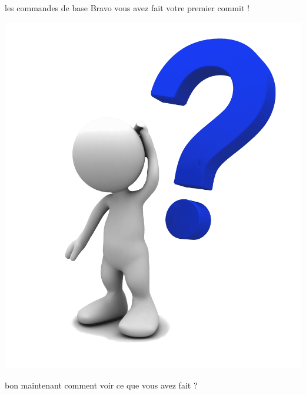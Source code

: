 \documentclass[usenames,dvipsnames]{beamer}
\begin{document}
\begin{frame}[fragile]{les commandes de base}
	Bravo vous avez fait votre premier commit !
	\pause
	\begin{center}
		\includegraphics[width=0.5\linewidth]{Im/question-mark.png}
	\end{center}
	bon maintenant comment voir ce que vous avez fait ?
\end{frame}
\end{document}
